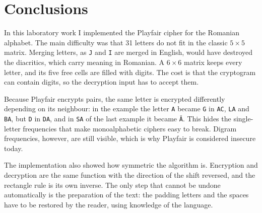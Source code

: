 \documentclass[12pt,a4paper]{article}
\begin{document}
\newpage
\section*{Conclusions}

In this laboratory work I implemented the Playfair cipher for the Romanian alphabet. The main difficulty was that 31 letters do not fit in the classic $5 \times 5$ matrix. Merging letters, as \texttt{J} and \texttt{I} are merged in English, would have destroyed the diacritics, which carry meaning in Romanian. A $6 \times 6$ matrix keeps every letter, and its five free cells are filled with digits. The cost is that the cryptogram can contain digits, so the decryption input has to accept them.

Because Playfair encrypts pairs, the same letter is encrypted differently depending on its neighbour: in the example the letter \texttt{A} became \texttt{G} in \texttt{AC}, \texttt{LA} and \texttt{BA}, but \texttt{D} in \texttt{DA}, and in \texttt{SA} of the last example it became \texttt{\u{A}}. This hides the single-letter frequencies that make monoalphabetic ciphers easy to break. Digram frequencies, however, are still visible, which is why Playfair is considered insecure today.

The implementation also showed how symmetric the algorithm is. Encryption and decryption are the same function with the direction of the shift reversed, and the rectangle rule is its own inverse. The only step that cannot be undone automatically is the preparation of the text: the padding letters and the spaces have to be restored by the reader, using knowledge of the language.
\end{document}
